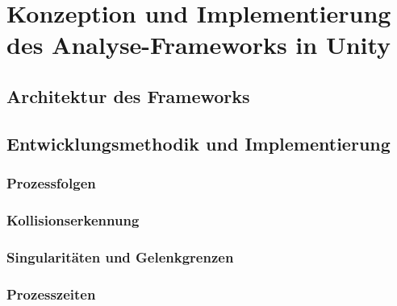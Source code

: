 \chapter{Konzeption und Implementierung des Analyse-Frameworks in Unity}
\label{cap:Framework}

\section{Architektur des Frameworks}
\label{sec:Architektur_Framework}

\section{Entwicklungsmethodik und Implementierung}
\label{sec:Implementierung_Framework}
\subsection{Prozessfolgen}
\label{ssec:Prozessfolgen}
\subsection{Kollisionserkennung}
\label{ssec:Kollisionserkennung}
\subsection{Singularitäten und Gelenkgrenzen}
\label{ssec:Singularitaeten}
\subsection{Prozesszeiten}
\label{ssec:Prozesszeiten}
